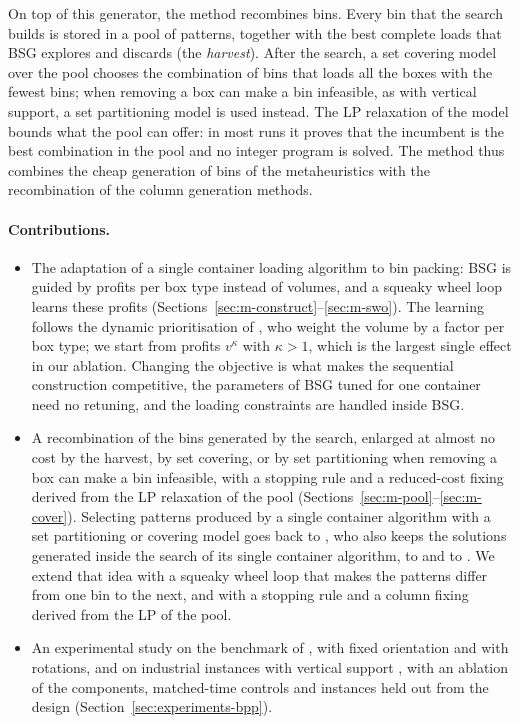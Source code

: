 On top of this generator, the method recombines bins. Every bin that the search builds is stored in a pool
of patterns, together with the best complete loads that BSG explores and discards (the \emph{harvest}).
After the search, a set covering model over the pool chooses the combination of bins that loads all the
boxes with the fewest bins; when removing a box can make a bin infeasible, as with vertical support, a set
partitioning model is used instead. The LP relaxation of the model bounds what the pool can offer: in most
runs it proves that the incumbent is the best combination in the pool and no integer program is solved.
The method thus combines the cheap generation of bins of the metaheuristics with the recombination of the
column generation methods.

\paragraph{Contributions.}
\begin{itemize}
\item The adaptation of a single container loading algorithm to bin packing: BSG is guided by profits per box
  type instead of volumes, and a squeaky wheel loop learns these profits
  (Sections~\ref{sec:m-construct}--\ref{sec:m-swo}). The learning follows the dynamic prioritisation of
  \citet{Lim2012}, who weight the volume by a factor per box type; we start from profits $v^\kappa$ with $\kappa>1$,
  which is the largest single effect in our ablation. Changing the objective is what makes the sequential
  construction competitive, the parameters of BSG tuned for one container need no retuning, and the
  loading constraints are handled inside BSG.
\item A recombination of the bins generated by the search, enlarged at almost no cost by the harvest, by set
  covering, or by set partitioning when removing a box can make a bin infeasible, with a stopping rule and a
  reduced-cost fixing derived from the LP relaxation of the pool (Sections~\ref{sec:m-pool}--\ref{sec:m-cover}).
  Selecting patterns produced by a single container algorithm with a set partitioning or covering model goes back to
  \citet{Eley2003}, who also keeps the solutions generated inside the search of its single container algorithm, to
  \citet{Monaci2006} and to \citet{Che2011}. We extend that idea with a squeaky wheel loop that makes the patterns
  differ from one bin to the next, and with a stopping rule and a column fixing derived from the LP of the pool.
\item An experimental study on the benchmark of \citet{Martello2000}, with fixed orientation and with
  rotations, and on industrial instances with vertical support \citep{Elhedhli2019}, with an ablation
  of the components, matched-time controls and instances held out from the design
  (Section~\ref{sec:experiments-bpp}).
\end{itemize}

